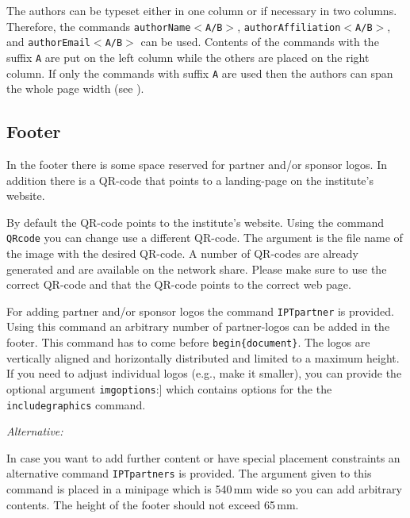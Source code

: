 The authors can be typeset either in one column or if necessary in two columns. Therefore, the commands \texttt{\bs{}authorName$<$A/B$>$}, \texttt{\bs{}authorAffiliation$<$A/B$>$}, and \texttt{\bs{}authorEmail$<$A/B$>$} can be used. Contents of the commands with the suffix \texttt{A} are put on the left column while the others are placed on the right column. If only the commands with suffix \texttt{A} are used then the authors can span the whole page width (see ).



\subsection{Footer} %
\label{subsed:footer}

In the footer there is some space reserved for partner and/or sponsor logos. In addition there is a QR-code that points to a landing-page on the institute's website.

By default the QR-code points to the institute's website. Using the command \texttt{\bs{}QRcode} you can change use a different QR-code. The argument is the file name of the image with the desired QR-code. A number of QR-codes are already generated and are available on the network share. Please make sure to use the correct QR-code and that the QR-code points to the correct web page.

For adding partner and/or sponsor logos the command \texttt{\bs{}IPTpartner} is provided. Using this command an arbitrary number of partner-logos can be added in the footer. This command has to come before \texttt{\bs{}begin\{document\}}. The logos are vertically aligned and horizontally distributed and limited to a maximum height. If you need to adjust individual logos (e.g., make it smaller), you can provide the optional argument \texttt{imgoptions}:] which contains options for the the \texttt{\bs{}includegraphics} command.

\textit{Alternative:}

In case you want to add further content or have special placement constraints an alternative command \texttt{\bs{}IPTpartners} is provided. The argument given to this command is placed in a minipage which is 540\,mm wide so you can add arbitrary contents. The height of the footer should not exceed 65\,mm.


